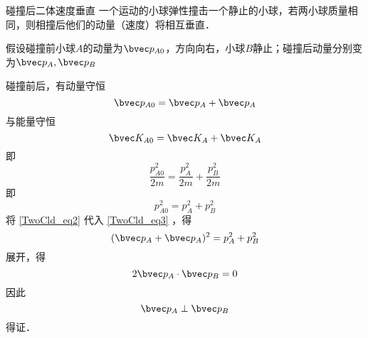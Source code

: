 \begin{example}{碰撞后二体速度垂直}
一个运动的小球弹性撞击一个静止的小球，若两小球质量相同，则相撞后他们的动量（速度）将相互垂直．

假设碰撞前小球$A$的动量为$\bvec p_{A0}$，方向向右，小球$B$静止；碰撞后动量分别变为$\bvec p_{A},\bvec p_{B}$

碰撞前后，有动量守恒
\begin{equation}\label{TwoCld_eq2}
\bvec p_{A0} = \bvec p_{A} + \bvec p_{A}
\end{equation}
与能量守恒
\begin{equation}
\bvec K_{A0} = \bvec K_{A} + \bvec K_{A}
\end{equation}
即
\begin{equation}
\frac{p_{A0}^2}{2m}=\frac{p_{A}^2}{2m}+\frac{p_{B}^2}{2m}
\end{equation}
即
\begin{equation}\label{TwoCld_eq3}
p_{A0}^2 = p_{A}^2+p_{B}^2
\end{equation}
将 \autoref{TwoCld_eq2} 代入 \autoref{TwoCld_eq3} ，得
\begin{equation}
(\bvec p_{A} + \bvec p_{A})^2=p_{A}^2+p_{B}^2
\end{equation}
展开，得
\begin{equation}
2\bvec p_{A} \cdot \bvec p_{B}=0
\end{equation}
因此
\begin{equation}
\bvec p_{A} \perp \bvec p_{B}
\end{equation}
得证．
\end{example}



